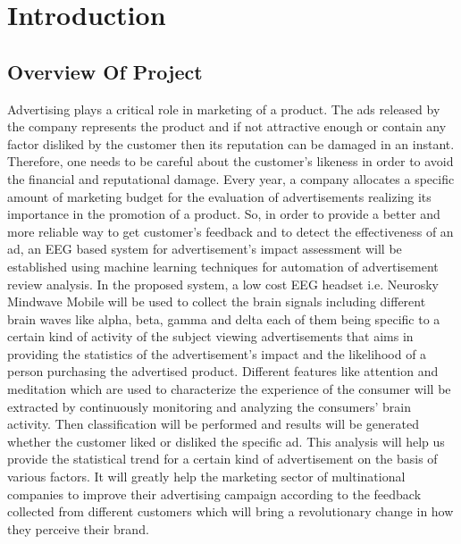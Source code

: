 \documentclass[a4paper, 12pt, oneside]{uet_thesis}
\begin{document}


\newpage
\chapter{Introduction}
\section{Overview Of Project}
Advertising plays a critical role in marketing of a product. The ads released by the company represents the product and if not attractive enough or contain any factor disliked by the customer then its reputation can be damaged in an instant. Therefore, one needs to be careful about the customer’s likeness in order to avoid the financial and reputational damage. Every year, a company allocates a specific amount of marketing budget for the evaluation of advertisements realizing its importance in the promotion of a product. So, in order to provide a better and more reliable way to get customer’s feedback and to detect the effectiveness of an ad, an EEG based system for advertisement’s impact assessment will be established using machine learning techniques for automation of advertisement review analysis. In the proposed system, a low cost EEG headset i.e. Neurosky Mindwave Mobile will be used to collect the brain signals including different brain waves like alpha, beta, gamma and delta each of them being specific to a certain kind of activity of the subject viewing advertisements that aims in providing the statistics of the advertisement's impact and the likelihood of a person purchasing the advertised product. Different features like attention and meditation which are used to characterize the experience of the consumer will be extracted by continuously monitoring and analyzing the consumers’ brain activity. Then classification will be performed and results will be generated whether the customer liked or disliked the specific ad. This analysis will help us provide the statistical trend for a certain kind of advertisement on the basis of various factors. It will greatly help the marketing sector of multinational companies to improve their advertising campaign according to the feedback collected from different customers which will bring a revolutionary change in how they perceive their brand.
\end{document}
